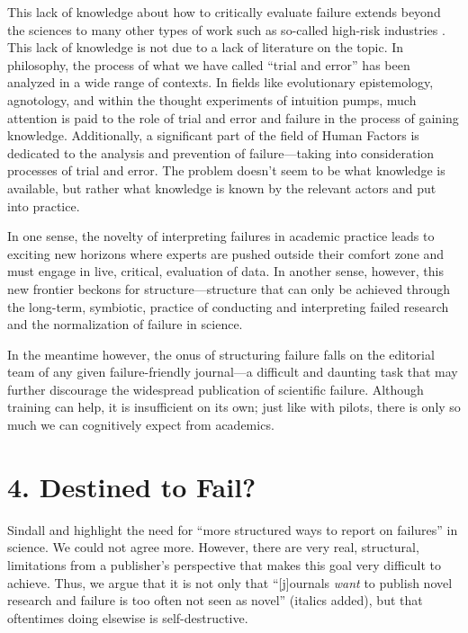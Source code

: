 \documentclass{article}
\begin{document}
This lack of knowledge about how to critically evaluate failure extends beyond the sciences to many other types of work such as so-called high-risk industries \parencite{Bevilacqua2018}. This lack of knowledge is not due to a lack of literature on the topic. In philosophy, the process of what we have called “trial and error” has been analyzed in a wide range of contexts. In fields like evolutionary epistemology, agnotology, and within the thought experiments of intuition pumps, much attention is paid to the role of trial and error and failure in the process of gaining knowledge. Additionally, a significant part of the field of Human Factors is dedicated to the analysis and prevention of failure—taking into consideration processes of trial and error. The problem doesn't seem to be what knowledge is available, but rather what knowledge is known by the relevant actors and put into practice. 

In one sense, the novelty of interpreting failures in academic practice leads to exciting new horizons where experts are pushed outside their comfort zone and must engage in live, critical, evaluation of data. In another sense, however, this new frontier beckons for structure—structure that can only be achieved through the long-term, symbiotic, practice of conducting and interpreting failed research and the normalization of failure in science.

In the meantime however, the onus of structuring failure falls on the editorial team of any given failure-friendly journal—a difficult and daunting task that may further discourage the widespread publication of scientific failure. Although training can help, it is insufficient on its own; just like with pilots, there is only so much we can cognitively expect from academics. 

\section{}

\section{4\textbf{. }\textbf{Destined to Fail?}}

\textbf{}Sindall and \parencite{Barrington2020} highlight the need for “more structured ways to report on failures” in science. We could not agree more. However, there are very real, structural, limitations from a publisher's perspective that makes this goal very difficult to achieve. Thus, we argue that it is not only that “[j]ournals \emph{want} to publish novel research and failure is too often not seen as novel” (italics added), but that oftentimes doing elsewise is self-destructive. 
\end{document}
